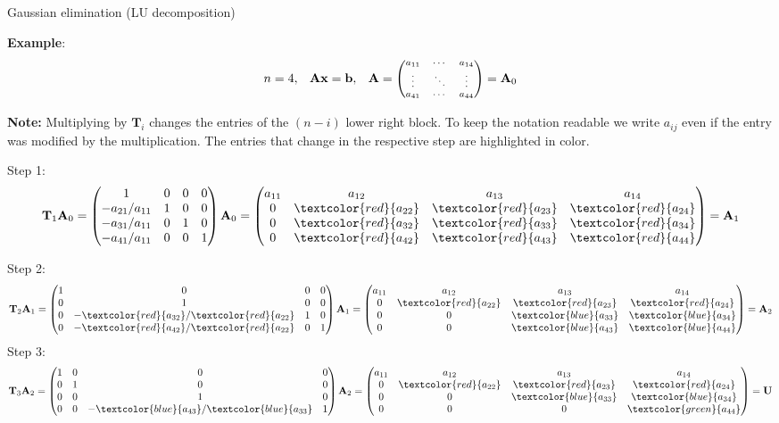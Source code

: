\begin{vbframe}{Gaussian elimination (LU decomposition)}
\begin{enumerate}
\framebreak

\textbf{Example}:
$$ \scriptsize
n = 4, \quad \mathbf{Ax} = \mathbf{b}, \quad \mathbf{A} = \begin{pmatrix} 
a_{11} & \cdots & a_{14} \\
\vdots & \ddots & \vdots \\
a_{41} & \cdots & a_{44}  \end{pmatrix}
= \mathbf{A}_0
$$

\footnotesize{
\textbf{Note:} Multiplying by $\mathbf{T}_i$ changes the entries of the $(n - i)$ lower right block. To keep the notation readable we write $a_{ij}$ even if the entry was modified by the multiplication. The entries that change in the respective step are highlighted in color. }

\lz

\normalsize
Step 1: \scriptsize
$$
\mathbf{T}_1 \Amat_0 = \mat{
1                & 0 & 0 & 0 \\
-a_{21} / a_{11} & 1 & 0 & 0 \\
-a_{31} / a_{11} & 0 & 1 & 0 \\
-a_{41} / a_{11} & 0 & 0 & 1 }
\Amat_0 =
\mat{
a_{11} & a_{12} & a_{13} & a_{14} \\
0      & \textcolor{red}{a_{22}} & \textcolor{red}{a_{23}} & \textcolor{red}{a_{24}} \\
0      & \textcolor{red}{a_{32}} & \textcolor{red}{a_{33}} & \textcolor{red}{a_{34}} \\
0      & \textcolor{red}{a_{42}} & \textcolor{red}{a_{43}} & \textcolor{red}{a_{44}} }
= \Amat_1
$$

\normalsize

\framebreak

Step 2: \scriptsize
$$
\mathbf{T}_2 \Amat_1 = \mat{
1 & 0                & 0 & 0 \\
0 & 1                & 0 & 0 \\
0 & -\textcolor{red}{a_{32}} / \textcolor{red}{a_{22}} & 1 & 0 \\
0 & -\textcolor{red}{a_{42}} / \textcolor{red}{a_{22}} & 0 & 1 }
\Amat_1 =
\mat{
a_{11} & a_{12} & a_{13} & a_{14} \\
0      & \textcolor{red}{a_{22}} & \textcolor{red}{a_{23}} & \textcolor{red}{a_{24}} \\
0      & 0      & \textcolor{blue}{a_{33}} & \textcolor{blue}{a_{34}} \\
0      & 0      & \textcolor{blue}{a_{43}} & \textcolor{blue}{a_{44}} }
= \Amat_2
$$ \normalsize
Step 3: \scriptsize
$$
\mathbf{T}_3 \Amat_2 = \mat{
1 & 0 & 0                & 0 \\
0 & 1 & 0                & 0 \\
0 & 0 & 1                & 0 \\
0 & 0 & -\textcolor{blue}{a_{43}} / \textcolor{blue}{a_{33}} & 1 }
\Amat_2 =
\mat{
a_{11} & a_{12} & a_{13} & a_{14} \\
0      & \textcolor{red}{a_{22}} & \textcolor{red}{a_{23}} & \textcolor{red}{a_{24}} \\
0      & 0      & \textcolor{blue}{a_{33}} & \textcolor{blue}{a_{34}} \\
0      & 0      & 0      & \textcolor{green}{a_{44}} } = \mathbf{U}
$$


\end{enumerate}
\end{vbframe}
